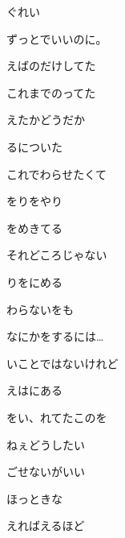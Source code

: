 \documentclass[a4paper,tate,twocolumn,12pt]{ltjtarticle}
\begin{document}
\thispagestyle{empty}

\begin{center}
{\LARGE {}ぐれい}

{\large ずっとでいいのに。}
\end{center}

\vspace{1em}

\begin{flushleft}

\noindent\begin{minipage}{\linewidth}
えばのだけしてた

これまでのってた

えたかどうだか

るについた

これでわらせたくて

をりをやり

をめきてる
\end{minipage}

\vspace{2em}

\noindent\begin{minipage}{\linewidth}

それどころじゃない

りをにめる

わらないをも

なにかをするには…

いことではないけれど

えはにある

をい、れてたこのを
\end{minipage}

\vspace{2em}

\noindent\begin{minipage}{\linewidth}
ねぇどうしたい

ごせないがいい

ほっときな

えればえるほど


\end{minipage}
\end{flushleft}
\end{document}
